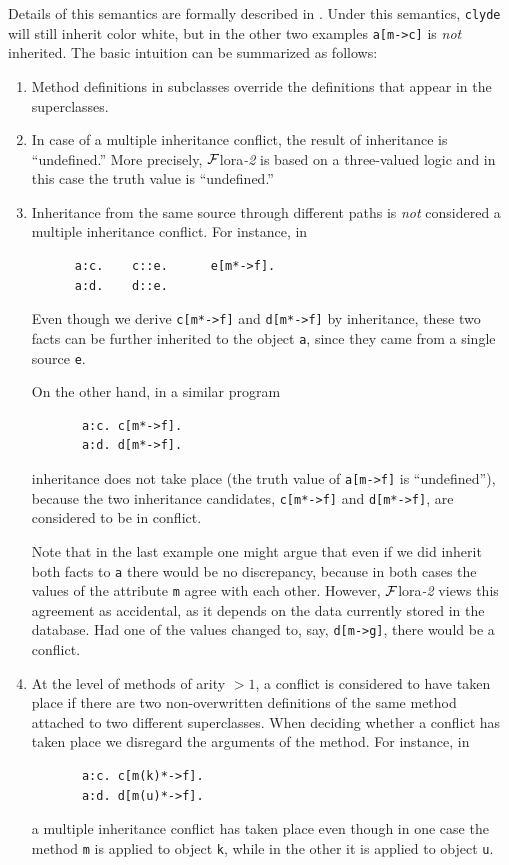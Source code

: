 \documentclass[11pt]{article}
\newcommand{\FLORA}{{\mbox{\sc ${\cal F}${lora}\rm\emph{-2}}}\xspace}
\begin{document}
Details of this semantics are formally described in
\cite{inheritance-odbase-02}.  Under this semantics, {\tt clyde} will still
inherit color white, but in the other two examples {\tt a[m->c]} is
\emph{not} inherited.  The basic intuition can be summarized as follows:
\begin{enumerate}
\item  Method definitions in subclasses override the definitions that
  appear in the superclasses.
\item In case of a multiple inheritance conflict, the result of inheritance
  is ``undefined.'' More precisely, \FLORA is based on a three-valued logic and
  in this case the truth value is ``undefined.''
\item  Inheritance from the same source through different paths is
  \emph{not} considered a multiple inheritance conflict. For instance, in
  \begin{verbatim}
      a:c.    c::e.      e[m*->f].    
      a:d.    d::e.
  \end{verbatim}
  Even though we derive {\tt c[m*->f]} and {\tt d[m*->f]} by inheritance,
  these two facts can be further inherited to the object {\tt a}, since
  they came from a single source {\tt e}.

  On the other hand, in a similar program
  \begin{verbatim}
       a:c. c[m*->f].    
       a:d. d[m*->f].     
  \end{verbatim}
  inheritance does not take place (the truth value of {\tt a[m->f]} is
  ``undefined''), because the two inheritance candidates, {\tt c[m*->f]} and
  {\tt d[m*->f]}, are considered to be in conflict.

  Note that in the last example one might argue that even if we did inherit
  both facts to {\tt a} there would be no discrepancy, because in both
  cases the values of the attribute {\tt m} agree with each other.
  However, \FLORA views this agreement as accidental, as it depends on the
  data currently stored in the database. Had one of the values changed to, say,
  {\tt d[m->g]}, there would be a conflict.
  
\item At the level of methods of arity $>1$, a conflict is considered to have
  taken place if there are two non-overwritten definitions of the same method
  attached to two different superclasses. When deciding whether a conflict
  has taken place we disregard the arguments of the method. For instance, in
  \begin{verbatim}
       a:c. c[m(k)*->f].    
       a:d. d[m(u)*->f].     
  \end{verbatim}
  a multiple inheritance conflict has taken place even though in one case
  the method {\tt m} is applied to object {\tt k}, while in the other it is
  applied to object {\tt u}. 


\end{enumerate}
\end{document}
